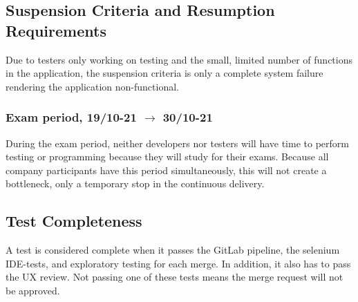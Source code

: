 \subsection{Suspension Criteria and Resumption Requirements}
Due to testers only working on testing and the small, limited number of functions in the application, the suspension criteria is only a complete system failure rendering the application non-functional.%
\subsubsection{Exam period, 19/10-21 $\xrightarrow{}$ 30/10-21}
During the exam period, neither developers nor testers will have time to perform testing or programming because they will study for their exams. Because all company participants have this period simultaneously, this will not create a bottleneck, only a temporary stop in the continuous delivery.
\subsection{Test Completeness}
A test is considered complete when it passes the GitLab pipeline, the selenium IDE-tests, and exploratory testing for each merge. In addition, it also has to pass the UX review. Not passing one of these tests means the merge request will not be approved.

